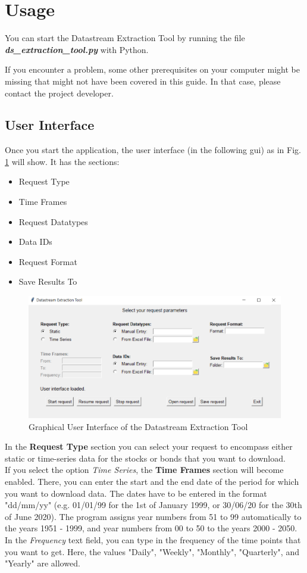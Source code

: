 \section{Usage}
You can start the Datastream Extraction Tool by running the file \textbf{\textit{ds\_extraction\_tool.py}} with Python. 

If you encounter a problem, some other prerequisites on your computer might be missing that might not have been covered in this guide. In that case, please contact the project developer. 

\subsection{User Interface}
Once you start the application, the user interface (in the following gui) as in Fig. \ref{fig:gui-2} will show. It has the sections: 
\begin{itemize}
	\item Request Type
	\item Time Frames
	\item Request Datatypes
	\item Data IDs
	\item Request Format
	\item Save Results To
\end{itemize}

\begin{figure}[h]
	\centering
	\includegraphics[width=1.1\linewidth]{figures/gui.png}
	\caption{Graphical User Interface of the Datastream Extraction Tool}
	\label{fig:gui-2}
\end{figure}

In the \textbf{Request Type} section you can select your request to encompass either static or time-series data for the stocks or bonds that you want to download. \\

If you select the option \textit{Time Series}, the \textbf{Time Frames} section will become enabled. There, you can enter the start and the end date of the period for which you want to download data. The dates have to be entered in the format "dd/mm/yy" (e.g. 01/01/99 for the 1st of January 1999, or 30/06/20 for the 30th of June 2020). The program assigns year numbers from 51 to 99 automatically to the years 1951 - 1999, and year numbers from 00 to 50 to the years 2000 - 2050. 
In the \textit{Frequency} text field, you can type in the frequency of the time points that you want to get. Here, the values "Daily", "Weekly", "Monthly", "Quarterly", and "Yearly" are allowed. \\


